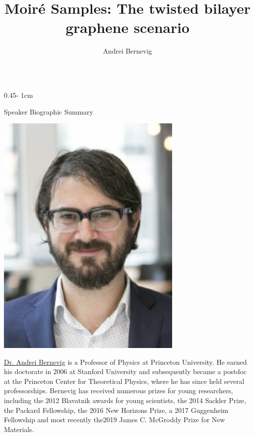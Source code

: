 \documentclass{../psuposter}
\title{Moiré Samples: The twisted bilayer graphene scenario}
\author{Andrei Bernevig}
\institute{Princeton University}
\begin{document}
\begin{frame}
\begin{columns}[t, totalwidth=\textwidth]
\begin{column}{0.45\textwidth - 1cm}


    \begin{block}{Speaker Biographic Summary}
    	\begin{center}
    		\includegraphics[width=0.68\textwidth]{images/portrait}
    	\end{center}
    	\href{https://phy.princeton.edu/people/bogdan-bernevig}{Dr. Andrei Bernevig} is a Professor of Physics at Princeton University. He earned his doctorate in 2006 at Stanford University and subsequently became a postdoc at the Princeton Center for Theoretical Physics, where he has since held several professorships. Bernevig has received numerous prizes for young researchers, including the 2012 Blavatnik awards for young scientists, the 2014 Sackler Prize, the Packard Fellowship, the 2016 New Horizons Prize, a 2017 Guggenheim Fellowship and most recently the2019 James C. McGroddy Prize for New Materials.

    \end{block}



\end{column}
\end{columns}
\end{frame}
\end{document}
